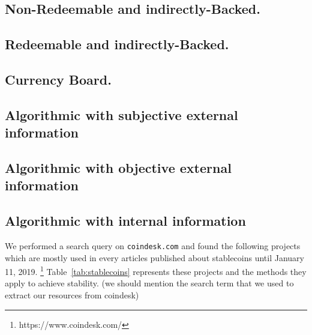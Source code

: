 \subsection{Non-Redeemable and indirectly-Backed.} 


\subsection{Redeemable and indirectly-Backed.} 

 \subsection{Currency Board.} 

\subsection{Algorithmic with subjective external information} 

\subsection{Algorithmic with objective external information} 

\subsection{Algorithmic with internal information} 

We performed a search query on \texttt{coindesk.com} and found the following projects which are mostly used in every articles published about stablecoins until January 11, 2019. \footnote{https://www.coindesk.com/} Table~\ref{tab:stablecoins} represents these projects and the methods they apply to achieve stability. (we should mention the search term that we used to extract our resources from coindesk)



